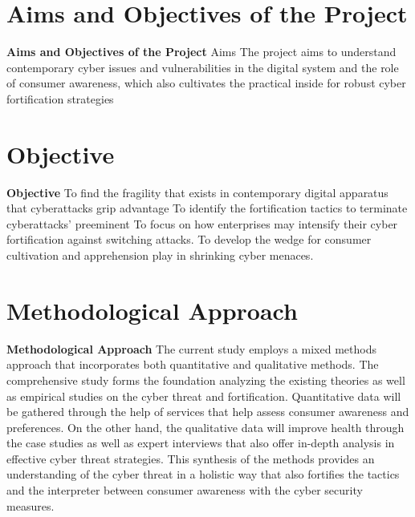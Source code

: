 
\section{Aims and Objectives of the Project}
\label{sec:into_back}
\textbf{Aims and Objectives of the Project}
Aims
The project aims to understand contemporary cyber issues and vulnerabilities in the digital system and the role of consumer awareness, which also cultivates the practical inside for robust cyber fortification strategies



\section{Objective}
\label{sec:into_back}
\textbf{Objective}
To find the fragility that exists in contemporary digital apparatus that cyberattacks grip advantage 
To identify the fortification tactics to terminate cyberattacks' preeminent
To focus on how enterprises may intensify their cyber fortification against switching attacks.
To develop the wedge for consumer cultivation and apprehension play in shrinking cyber menaces.



\section{Methodological Approach}
\label{sec:into_back}
\textbf{Methodological Approach}
The current study employs a mixed methods approach that incorporates both quantitative and qualitative methods. The comprehensive study forms the foundation analyzing the existing theories as well as empirical studies on the cyber threat and fortification. Quantitative data will be gathered through the help of services that help assess consumer awareness and preferences. On the other hand, the qualitative data will improve health through the case studies as well as expert interviews that also offer in-depth analysis in effective cyber threat strategies. This synthesis of the methods provides an understanding of the cyber threat in a holistic way that also fortifies the tactics and the interpreter between consumer awareness with the cyber security measures.





